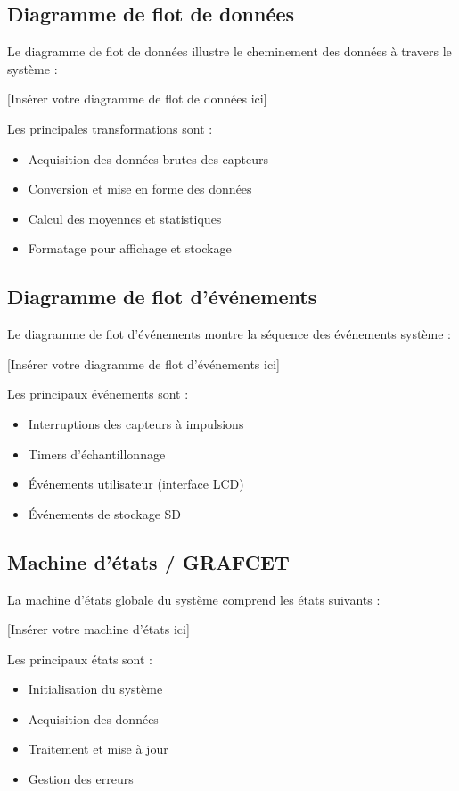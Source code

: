 \documentclass[12pt]{article}
\begin{document}
\subsection{Diagramme de flot de données}
Le diagramme de flot de données illustre le cheminement des données à travers le système :

[Insérer votre diagramme de flot de données ici]

Les principales transformations sont :
\begin{itemize}
    \item Acquisition des données brutes des capteurs
    \item Conversion et mise en forme des données
    \item Calcul des moyennes et statistiques
    \item Formatage pour affichage et stockage
\end{itemize}

\subsection{Diagramme de flot d'événements}
Le diagramme de flot d'événements montre la séquence des événements système :

[Insérer votre diagramme de flot d'événements ici]

Les principaux événements sont :
\begin{itemize}
    \item Interruptions des capteurs à impulsions
    \item Timers d'échantillonnage
    \item Événements utilisateur (interface LCD)
    \item Événements de stockage SD
\end{itemize}

\subsection{Machine d'états / GRAFCET}
La machine d'états globale du système comprend les états suivants :

[Insérer votre machine d'états ici]

Les principaux états sont :
\begin{itemize}
    \item Initialisation du système
    \item Acquisition des données
    \item Traitement et mise à jour
    \item Gestion des erreurs
\end{itemize}
\end{document}
